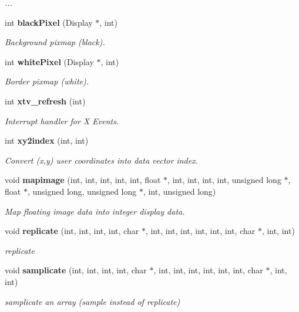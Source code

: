 \begin{CompactItemize}
\begin{CompactList}\small\item\em ... \item\end{CompactList}\item 
int {\bf black\-Pixel} (Display $\ast$, int)
\begin{CompactList}\small\item\em Background pixmap (black). \item\end{CompactList}\item 
int {\bf white\-Pixel} (Display $\ast$, int)
\begin{CompactList}\small\item\em Border pixmap (white). \item\end{CompactList}\item 
int {\bf xtv\_\-refresh} (int)
\begin{CompactList}\small\item\em Interrupt handler for X Events. \item\end{CompactList}\item 
int {\bf xy2index} (int, int)
\begin{CompactList}\small\item\em Convert (x,y) user coordinates into data vector index. \item\end{CompactList}\item 
void {\bf mapimage} (int, int, int, int, int, float $\ast$, int, int, int, int, unsigned long $\ast$, float $\ast$, unsigned long, unsigned long $\ast$, int, unsigned long)
\begin{CompactList}\small\item\em Map floating image data into integer display data. \item\end{CompactList}\item 
void {\bf replicate} (int, int, int, int, char $\ast$, int, int, int, int, int, int, char $\ast$, int, int)
\begin{CompactList}\small\item\em replicate \item\end{CompactList}\item 
void {\bf samplicate} (int, int, int, int, char $\ast$, int, int, int, int, int, int, char $\ast$, int, int)
\begin{CompactList}\small\item\em samplicate an array (sample instead of replicate) \item\end{CompactList}\item 

\end{CompactItemize}
